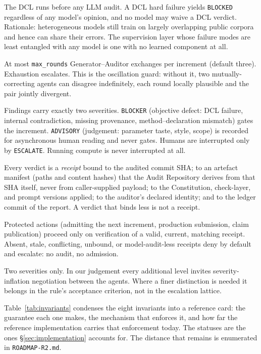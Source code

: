 \documentclass[11pt]{article}
\newcommand{\invariant}[1]{\textbf{I#1}}
\begin{document}
\begin{description}[itemsep=2pt,topsep=3pt]
  \item[\invariant{4} --- Determinism first.] The DCL runs before any LLM audit. A DCL hard failure yields \texttt{BLOCKED} regardless of any model's opinion, and no model may waive a DCL verdict. Rationale: heterogeneous models still train on largely overlapping public corpora and hence can share their errors. The supervision layer whose failure modes are least entangled with any model is one with no learned component at all.
  \item[\invariant{5} --- Bounded revision.] At most \texttt{max\_rounds} Generator--Auditor exchanges per increment (default three). Exhaustion escalates. This is the oscillation guard: without it, two mutually-correcting agents can disagree indefinitely, each round locally plausible and the pair jointly divergent.
  \item[\invariant{6} --- Graded interruption.] Findings carry exactly two severities. \texttt{BLOCKER} (objective defect: DCL failure, internal contradiction, missing provenance, method--declaration mismatch) gates the increment. \texttt{ADVISORY} (judgement: parameter taste, style, scope) is recorded for asynchronous human reading and never gates. Humans are interrupted only by \texttt{ESCALATE}. Running compute is never interrupted at all.
  \item[\invariant{7} --- Receipt binding.] Every verdict is a \emph{receipt} bound to the audited commit SHA; to an artefact manifest (paths and content hashes) that the Audit Repository derives from that SHA itself, never from caller-supplied payload; to the Constitution, check-layer, and prompt versions applied; to the auditor's declared identity; and to the ledger commit of the report. A verdict that binds less is not a receipt.
  \item[\invariant{8} --- Fail-closed admission.] Protected actions (admitting the next increment, production submission, claim publication) proceed only on verification of a valid, current, matching receipt. Absent, stale, conflicting, unbound, or model-audit-less receipts deny by default and escalate: no audit, no admission.
\end{description}

Two severities only. In our judgement every additional level invites severity-inflation negotiation between the agents. Where a finer distinction is needed it belongs in the rule's acceptance criterion, not in the escalation lattice.

Table~\ref{tab:invariants} condenses the eight invariants into a reference card: the guarantee each one makes, the mechanism that enforces it, and how far the reference implementation carries that enforcement today. The statuses are the ones \S\ref{sec:implementation} accounts for. The distance that remains is enumerated in \texttt{ROADMAP-R2.md}.
\end{document}
